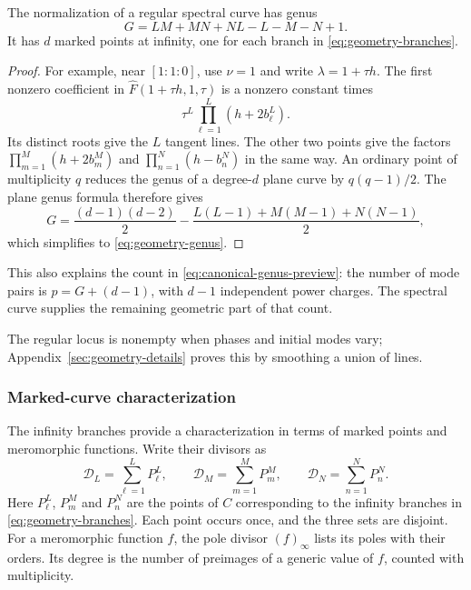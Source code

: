 \begin{proposition}\label{prop:geometry-genus}
The normalization of a regular spectral curve has genus
\begin{equation}\label{eq:geometry-genus}
 G=LM+MN+NL-L-M-N+1.
\end{equation}
It has $d$ marked points at infinity, one for each branch in
\cref{eq:geometry-branches}.
\end{proposition}
\begin{proof}
For example, near $[1:1:0]$, use $\nu=1$ and write
$\lambda=1+\tau h$. The first nonzero coefficient in
$\widehat F(1+\tau h,1,\tau)$ is a nonzero constant times
\[
 \tau^L\prod_{\ell=1}^{L}(h+2b_\ell^L).
\]
Its distinct roots give the $L$ tangent lines. The other two points
give the factors
$\prod_{m=1}^{M}(h+2b_m^M)$ and
$\prod_{n=1}^{N}(h-b_n^N)$ in the same way.
An ordinary point of multiplicity $q$ reduces the genus of a degree-$d$
plane curve by $q(q-1)/2$. The plane genus formula
\cite[Chapter~IV, \S1]{Hartshorne1977} therefore gives
\[
 G=\frac{(d-1)(d-2)}2
   -\frac{L(L-1)+M(M-1)+N(N-1)}2,
\]
which simplifies to \cref{eq:geometry-genus}.
\end{proof}

This also explains the count in \cref{eq:canonical-genus-preview}:
the number of mode pairs is $p=G+(d-1)$, with $d-1$ independent
power charges. The spectral curve supplies the remaining geometric
part of that count.

The regular locus is nonempty when phases and initial modes vary;
Appendix~\ref{sec:geometry-details} proves this by smoothing a
union of lines.

\subsubsection{Marked-curve characterization}

The infinity branches provide a characterization in terms of marked
points and meromorphic functions. Write their divisors as
\begin{equation}\label{eq:geometry-markings}
 \mathcal D_L=\sum_{\ell=1}^{L}P_\ell^L,\qquad
 \mathcal D_M=\sum_{m=1}^{M}P_m^M,\qquad
 \mathcal D_N=\sum_{n=1}^{N}P_n^N.
\end{equation}
Here $P_\ell^L$, $P_m^M$ and $P_n^N$ are the points of $C$
corresponding to the infinity branches in \cref{eq:geometry-branches}.
Each point occurs once, and the three sets are disjoint.
For a meromorphic function $f$, the pole divisor $(f)_\infty$
lists its poles with their orders. Its degree is the number of
preimages of a generic value of $f$, counted with multiplicity.

